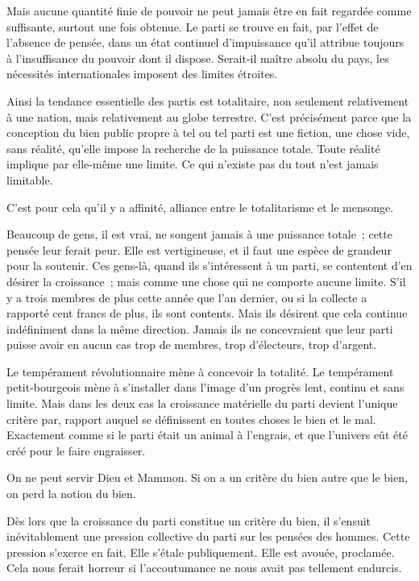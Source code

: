 \documentclass[french,twoside]{book} %
\begin{document}
Mais aucune quantité finie de pouvoir ne peut jamais être en fait regardée comme suffisante, surtout une fois obtenue. Le parti se trouve en fait, par l’effet de l’absence de pensée, dans un état continuel d’impuissance qu’il attribue toujours à l’insuffisance du pouvoir dont il dispose. Serait-il maître absolu du pays, les nécessités internationales imposent des limites étroites.\par
Ainsi la tendance essentielle des partis est totalitaire, non seulement relativement à une nation, mais relativement au globe terrestre. C’est précisément parce que la conception du bien public propre à tel ou tel parti est une fiction, une chose vide, sans réalité, qu’elle impose la recherche de la puissance totale. Toute réalité implique par elle-même une limite. Ce qui n’existe pas du tout n’est jamais limitable.\par
C’est pour cela qu’il y a affinité, alliance entre le totalitarisme et le mensonge.\par
Beaucoup de gens, il est vrai, ne songent jamais à une puissance totale ; cette pensée leur ferait peur. Elle est vertigineuse, et il faut une espèce de grandeur pour la soutenir. Ces gens-là, quand ils s’intéressent à un parti, se contentent d’en désirer la croissance ; mais comme une chose qui ne comporte aucune limite. S’il y a trois membres de plus cette année que l’an dernier, ou si la collecte a rapporté cent francs de plus, ils sont contents. Mais ils désirent que cela continue indéfiniment dans la même direction. Jamais ils ne concevraient que leur parti puisse avoir en aucun cas trop de membres, trop d’électeurs, trop d’argent.\par
Le tempérament révolutionnaire mène à concevoir la totalité. Le tempérament petit-bourgeois mène à s’installer dans l’image d’un progrès lent, continu et sans limite. Mais dans les deux cas la croissance matérielle du parti devient l’unique critère par, rapport auquel se définissent en toutes choses le bien et le mal. Exactement comme si le parti était un animal à l’engrais, et que l’univers eût été créé pour le faire engraisser.\par
On ne peut servir Dieu et Mammon. Si on a un critère du bien autre que le bien, on perd la notion du bien.\par
Dès lors que la croissance du parti constitue un critère du bien, il s’ensuit inévitablement une pression collective du parti sur les pensées des hommes. Cette pression s’exerce en fait. Elle s’étale publiquement. Elle est avouée, proclamée. Cela nous ferait horreur si l’accoutumance ne nous avait pas tellement endurcis.\par
\end{document}
